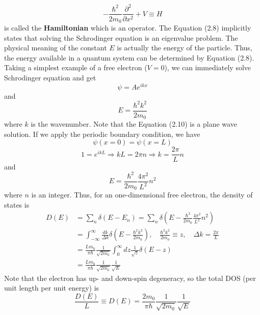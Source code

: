 \begin{equation}
    -\frac{\hbar^{2}}{2m_{0}}\frac{\partial^{2}}{\partial x^{2}} + V \equiv H
\end{equation} is called the {\bf Hamiltonian} which is an operator. The Equation (2.8) implicitly states that solving the Schrodinger equation is an eigenvalue problem. The physical meaning of the constant $E$ is actually the energy of the particle. Thus, the energy available in a quantum system can be determined by Equation (2.8). Taking a simplest example of a free electron ($V = 0$), we can immediately solve Schrodinger equation and get \begin{equation}
    \psi = A e^{ikx}
\end{equation} and \begin{equation}
    E = \frac{\hbar^{2}k^{2}}{2m_{0}}
\end{equation} where $k$ is the wavenumber. Note that the Equation (2.10) is a plane wave solution. If we apply the periodic boundary condition, we have \begin{equation}
    \psi\left(x=0\right) = \psi\left(x=L\right)\nonumber
\end{equation} \begin{equation}
    1 = e^{ikL} \Rightarrow kL=2\pi n \Rightarrow k = \frac{2\pi}{L}n
\end{equation} and \begin{equation}
    E = \frac{\hbar^{2}}{2m_{0}}\frac{4\pi^{2}}{L^{2}}n^{2}
\end{equation} where $n$ is an integer. Thus, for an one-dimensional free electron, the density of states is \begin{align}
    D\left(E\right)&= \sum_{n}{\delta\left(E-E_{n}\right)} = \sum_{n}{\delta\left(E-\frac{\hbar^{2}}{2m_{0}}\frac{4\pi^{2}}{L^{2}}n^{2}\right)}\nonumber\\
    & = \int_{-\infty}^{\infty}\frac{dk}{\Delta k}\delta\left(E-\frac{\hbar^{2}k^{2}}{2m_{0}}\right),\quad\frac{\hbar^{2}k^{2}}{2m_{0}}\equiv z,\quad \Delta k = \frac{2\pi}{L} \nonumber\\
    & = \frac{Lm_{0}}{\pi\hbar}\frac{1}{\sqrt{2m_{0}}}\int_{0}^{\infty}dz\frac{1}{\sqrt{z}}\delta\left(E-z\right) \nonumber\\
    & = \frac{Lm_{0}}{\pi\hbar}\frac{1}{\sqrt{2m_{0}}}\frac{1}{\sqrt{E}}
\end{align} Note that the electron has up- and down-spin degeneracy, so the total DOS (per unit length per unit energy) is \begin{equation}
    \boxed{\frac{D\left(E\right)}{L} \equiv D\left(E\right) = \frac{2m_{0}}{\pi\hbar}\frac{1}{\sqrt{2m_{0}}}\frac{1}{\sqrt{E}}}
\end{equation}

